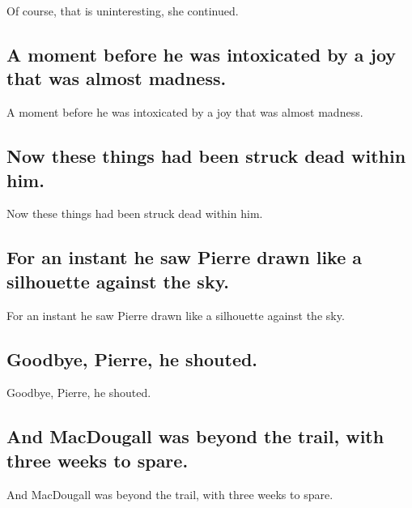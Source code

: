 \documentclass[]{article}
\begin{document}
Of course, that is uninteresting, she continued.

\hypertarget{a-moment-before-he-was-intoxicated-by-a-joy-that-was-almost-madness.}{%
\subsection{A moment before he was intoxicated by a joy that was almost
madness.}\label{a-moment-before-he-was-intoxicated-by-a-joy-that-was-almost-madness.}}

A moment before he was intoxicated by a joy that was almost madness.

\hypertarget{now-these-things-had-been-struck-dead-within-him.}{%
\subsection{Now these things had been struck dead within
him.}\label{now-these-things-had-been-struck-dead-within-him.}}

Now these things had been struck dead within him.

\hypertarget{for-an-instant-he-saw-pierre-drawn-like-a-silhouette-against-the-sky.}{%
\subsection{For an instant he saw Pierre drawn like a silhouette against
the
sky.}\label{for-an-instant-he-saw-pierre-drawn-like-a-silhouette-against-the-sky.}}

For an instant he saw Pierre drawn like a silhouette against the sky.

\hypertarget{goodbye-pierre-he-shouted.}{%
\subsection{Goodbye, Pierre, he
shouted.}\label{goodbye-pierre-he-shouted.}}

Goodbye, Pierre, he shouted.

\hypertarget{and-macdougall-was-beyond-the-trail-with-three-weeks-to-spare.}{%
\subsection{And MacDougall was beyond the trail, with three weeks to
spare.}\label{and-macdougall-was-beyond-the-trail-with-three-weeks-to-spare.}}

And MacDougall was beyond the trail, with three weeks to spare.
\end{document}
